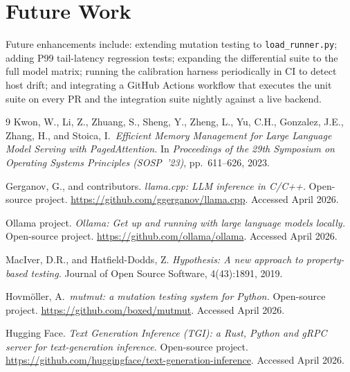 \documentclass[sigconf,nonacm]{acmart}
\begin{document}
\section{Future Work}
Future enhancements include: extending mutation testing to
\texttt{load\_runner.py}; adding P99 tail-latency regression tests;
expanding the differential suite to the full model matrix; running the
calibration harness periodically in CI to detect host drift; and
integrating a GitHub Actions workflow that executes the unit suite on
every PR and the integration suite nightly against a live backend.

\begin{thebibliography}{9}
 Kwon, W., Li, Z., Zhuang, S., Sheng, Y., Zheng, L.,
Yu, C.H., Gonzalez, J.E., Zhang, H., and Stoica, I.\ \emph{Efficient
Memory Management for Large Language Model Serving with
PagedAttention.} In \emph{Proceedings of the 29th Symposium on
Operating Systems Principles (SOSP~'23)}, pp.~611--626, 2023.

 Gerganov, G., and contributors. \emph{llama.cpp:
LLM inference in C/C++.} Open-source project.
\url{https://github.com/ggerganov/llama.cpp}. Accessed April 2026.

 Ollama project. \emph{Ollama: Get up and running with
large language models locally.} Open-source project.
\url{https://github.com/ollama/ollama}. Accessed April 2026.

 MacIver, D.R., and Hatfield-Dodds, Z. \emph{Hypothesis:
A new approach to property-based testing.} Journal of Open Source
Software, 4(43):1891, 2019.

 Hovmöller, A.\ \emph{mutmut: a mutation testing system
for Python.} Open-source project.
\url{https://github.com/boxed/mutmut}. Accessed April 2026.

 Hugging Face. \emph{Text Generation Inference (TGI): a
Rust, Python and gRPC server for text-generation inference.}
Open-source project.
\url{https://github.com/huggingface/text-generation-inference}. Accessed
April 2026.
\end{thebibliography}
\end{document}
